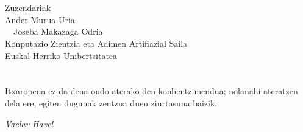 \documentclass[12pt,a4paper]{basque-book}
\renewcommand{\=}{"-}
\begin{document}

\frontmatter




\chapter*{}

\begin{center}



%

{\Huge Zuzendariak}\\[.8cm]
%
{\Large Ander Murua Uria}\\[.1cm] 
{\Large \ \ Joseba Makazaga Odria}\\[1.cm]
{\large Konputazio Zientzia eta Adimen Artifiazial Saila} \\[.1cm]
{\large Euskal-Herriko Unibertsitatea}
\\[.75cm]
%
\end{center}

\chapter*{}
\epigraph{Itxaropena ez da dena ondo aterako den konbentzimendua; nolanahi ateratzen dela ere, egiten dugunak zentzua duen ziurtasuna baizik.}
{\textit {Vaclav Havel}}
\end{document}
